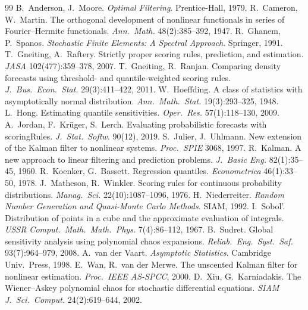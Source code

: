 \documentclass[10pt,twocolumn]{article}
\begin{document}
\scriptsize
\begin{thebibliography}{99}\setlength{\itemsep}{-1.2pt}\setlength{\parsep}{0pt}
 B.~Anderson, J.~Moore. \emph{Optimal Filtering}. Prentice-Hall, 1979.
 R.~Cameron, W.~Martin. The orthogonal development of nonlinear functionals in series of Fourier--Hermite functionals. \emph{Ann.\ Math.} 48(2):385--392, 1947.
 R.~Ghanem, P.~Spanos. \emph{Stochastic Finite Elements: A Spectral Approach}. Springer, 1991.
 T.~Gneiting, A.~Raftery. Strictly proper scoring rules, prediction, and estimation. \emph{JASA} 102(477):359--378, 2007.
 T.~Gneiting, R.~Ranjan. Comparing density forecasts using threshold- and quantile-weighted scoring rules. \emph{J.\ Bus.\ Econ.\ Stat.} 29(3):411--422, 2011.
 W.~Hoeffding. A class of statistics with asymptotically normal distribution. \emph{Ann.\ Math.\ Stat.} 19(3):293--325, 1948.
 L.~Hong. Estimating quantile sensitivities. \emph{Oper.\ Res.} 57(1):118--130, 2009.
 A.~Jordan, F.~Kr\"uger, S.~Lerch. Evaluating probabilistic forecasts with scoringRules. \emph{J.\ Stat.\ Softw.} 90(12), 2019.
 S.~Julier, J.~Uhlmann. New extension of the Kalman filter to nonlinear systems. \emph{Proc.\ SPIE} 3068, 1997.
 R.~Kalman. A new approach to linear filtering and prediction problems. \emph{J.\ Basic Eng.} 82(1):35--45, 1960.
 R.~Koenker, G.~Bassett. Regression quantiles. \emph{Econometrica} 46(1):33--50, 1978.
 J.~Matheson, R.~Winkler. Scoring rules for continuous probability distributions. \emph{Manag.\ Sci.} 22(10):1087--1096, 1976.
 H.~Niederreiter. \emph{Random Number Generation and Quasi-Monte Carlo Methods}. SIAM, 1992.
 I.~Sobol'. Distribution of points in a cube and the approximate evaluation of integrals. \emph{USSR Comput.\ Math.\ Math.\ Phys.} 7(4):86--112, 1967.
 B.~Sudret. Global sensitivity analysis using polynomial chaos expansions. \emph{Reliab.\ Eng.\ Syst.\ Saf.} 93(7):964--979, 2008.
 A.~van der Vaart. \emph{Asymptotic Statistics}. Cambridge Univ.\ Press, 1998.
 E.~Wan, R.~van der Merwe. The unscented Kalman filter for nonlinear estimation. \emph{Proc.\ IEEE AS-SPCC}, 2000.
 D.~Xiu, G.~Karniadakis. The Wiener--Askey polynomial chaos for stochastic differential equations. \emph{SIAM J.\ Sci.\ Comput.} 24(2):619--644, 2002.
\end{thebibliography}
\end{document}
